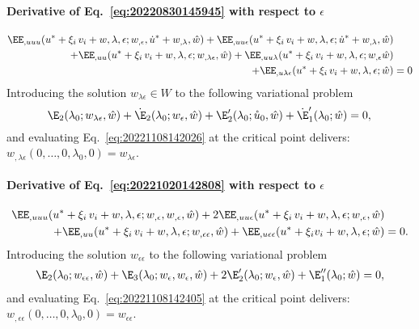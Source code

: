 \paragraph{Derivative of Eq.~\eqref{eq:20220830145945} with respect to \(\epsilon\)}
\begin{equation}
  \label{eq:20221108142026}
  \begin{aligned}[b]
    \EE_{,uuu}(u^\ast + \xi_i \, v_i + w, \lambda, \epsilon; w_{,\epsilon}, \dot{u}^\ast + w_{,\lambda}, \hat{w}) + \EE_{,uu\epsilon}(u^\ast + \xi_i \, v_i + w, \lambda, \epsilon; \dot{u}^\ast + w_{,\lambda}, \hat{w}) &\\
    + \EE_{,uu}(u^\ast + \xi_i \, v_i + w, \lambda, \epsilon; w_{,\lambda\epsilon}, \hat{w}) + \EE_{,uu\lambda}(u^\ast + \xi_i \, v_i + w, \lambda, \epsilon; w_{,\epsilon}\hat{w})&\\
    + \EE_{,u\lambda\epsilon}(u^\ast + \xi_i \, v_i + w, \lambda, \epsilon; \hat{w}) &= 0
  \end{aligned}
\end{equation}
Introducing the solution \(w_{\lambda\epsilon} \in W\) to the following variational problem
\begin{equation}
  \label{eq:20221030180909}
  \E_2(\lambda_0; w_{\lambda\epsilon}, \hat{w}) + \dot{\E}_2(\lambda_0; w_\epsilon, \hat{w})  + \E_2'(\lambda_0; \mathring{u}_0, \hat{w}) + \dot{\E}_1'(\lambda_0; \hat{w}) = 0,\\
\end{equation}
and evaluating Eq.~\eqref{eq:20221108142026} at the critical point delivers: \(w_{,\lambda\epsilon}(0, \ldots, 0, \lambda_0, 0) = w_{\lambda\epsilon}\).

\paragraph{Derivative of Eq.~\eqref{eq:20221020142808} with respect to \(\epsilon\)}
\begin{equation}
  \label{eq:20221108142405}
  \begin{aligned}[b]
    \EE_{,uuu}(u^\ast + \xi_i \, v_i + w, \lambda, \epsilon; w_{,\epsilon}, w_{,\epsilon}, \hat{w}) + 2\EE_{,uu\epsilon}(u^\ast + \xi_i \, v_i + w, \lambda, \epsilon; w_{,\epsilon}, \hat{w}) &\\
    + \EE_{,uu}(u^\ast + \xi_i \, v_i + w, \lambda, \epsilon; w_{,\epsilon\epsilon}, \hat{w}) + \EE_{,u\epsilon\epsilon}(u^\ast + \xi_i v_i + w, \lambda, \epsilon; \hat{w}) &= 0.
  \end{aligned}
\end{equation}
Introducing the solution \(w_{\epsilon\epsilon}\) to the following variational problem
\begin{gather}
  \label{eq:20221030181711}
  \E_2(\lambda_0; w_{\epsilon\epsilon}, \hat{w}) + \E_3(\lambda_0; w_\epsilon, w_\epsilon, \hat{w}) + 2\E_2'(\lambda_0; w_\epsilon, \hat{w}) + \E_1''(\lambda_0; \hat{w}) = 0,
\end{gather}
and evaluating Eq.~\eqref{eq:20221108142405} at the critical point delivers: \(w_{,\epsilon\epsilon}(0, \ldots, 0, \lambda_0, 0) = w_{\epsilon\epsilon}\).

